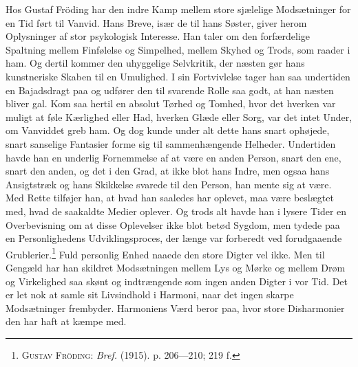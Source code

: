\documentclass[12pt]{article}
\newcommand{\opage}[1]{\marginnote{\footnotesize\textit{[#1]}}}
\begin{document}
Hos Gustaf Fröding har den indre Kamp mellem store sjælelige
Modsætninger for en Tid ført til Vanvid. Hans Breve, især de til hans
Søster, giver herom Oplysninger af stor psykologisk Interesse. Han
taler om den forfærdelige Spaltning mellem Finfølelse og Simpelhed,
mellem Skyhed og Trods, som raader i ham. Og dertil kommer den
uhyggelige Selvkritik, der næsten gør hans kunstneriske Skaben til en
Umulighed. I sin Fortvivlelse tager han saa undertiden en Bajadsdragt
paa og udfører den til%
\setcounter{footnote}{0}%
\opage{38}svarende Rolle saa godt, at han næsten bliver gal. Kom saa
hertil en absolut Tørhed og Tomhed, hvor det hverken var muligt at føle
Kærlighed eller Had, hverken Glæde eller Sorg, var det intet Under, om
Vanviddet greb ham. Og dog kunde under alt dette hans snart ophøjede,
snart sanselige Fantasier forme sig til sammenhængende Helheder.
Undertiden havde han en underlig Fornemmelse af at være en anden
Person, snart den ene, snart den anden, og det i den Grad, at ikke blot
hans Indre, men ogsaa hans Ansigtstræk og hans Skikkelse svarede til
den Person, han mente sig at være. Med Rette tilføjer han, at hvad han
saaledes har oplevet, maa være beslægtet med, hvad de saakaldte Medier
oplever. Og trods alt havde han i lysere Tider en Overbevisning om at
disse Oplevelser ikke blot betød Sygdom, men tydede paa \guillemotright{}en
Personlighedens Udviklingsproces, der længe var forberedt ved
forudgaaende Grublerier\guillemotleft{}.\footnote{\textsc{Gustav Fröding}:
\textit{Bref.} (1915). p. 206---210; 219 f.} Fuld personlig Enhed
naaede den store Digter vel ikke. Men til Gengæld har han skildret
Modsætningen mellem Lys og Mørke og mellem Drøm og Virkelighed saa
skønt og indtrængende som ingen anden Digter i vor Tid. Det er let nok
at samle sit Livsindhold i Harmoni, naar det ingen skarpe Modsætninger
frembyder. Harmoniens Værd beror paa, hvor store Disharmonier den har
haft at kæmpe med.
\end{document}
